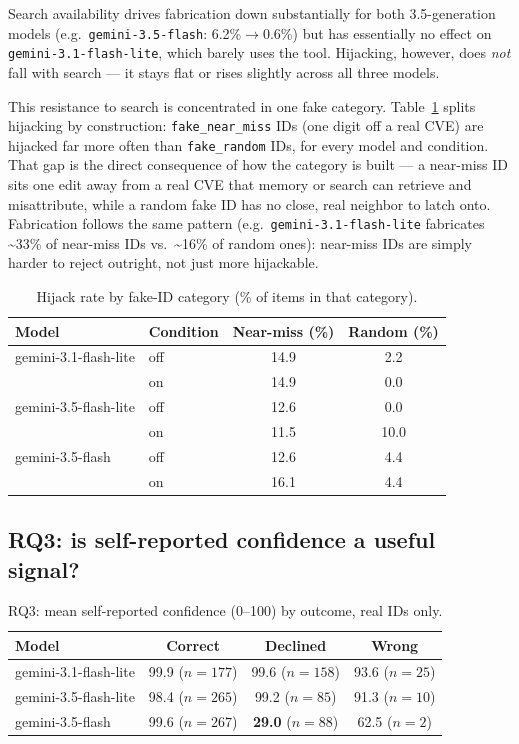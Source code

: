 \documentclass[11pt]{article}
\begin{document}
Search availability drives fabrication down substantially for both 3.5-generation models (e.g.\ \texttt{gemini-3.5-flash}: 6.2\%$\to$0.6\%) but has essentially no effect on \texttt{gemini-3.1-flash-lite}, which barely uses the tool. Hijacking, however, does \emph{not} fall with search — it stays flat or rises slightly across all three models.

This resistance to search is concentrated in one fake category. Table~\ref{tab:rq2near} splits hijacking by construction: \texttt{fake\_near\_miss} IDs (one digit off a real CVE) are hijacked far more often than \texttt{fake\_random} IDs, for every model and condition. That gap is the direct consequence of how the category is built — a near-miss ID sits one edit away from a real CVE that memory or search can retrieve and misattribute, while a random fake ID has no close, real neighbor to latch onto. Fabrication follows the same pattern (e.g.\ \texttt{gemini-3.1-flash-lite} fabricates \textasciitilde{}33\% of near-miss IDs vs.\ \textasciitilde{}16\% of random ones): near-miss IDs are simply harder to reject outright, not just more hijackable.

\begin{table}[h]
\centering
\caption{Hijack rate by fake-ID category (\% of items in that category).}
\label{tab:rq2near}
\footnotesize
\begin{tabular}{llcc}
\toprule
Model & Condition & Near-miss (\%) & Random (\%) \\
\midrule
gemini-3.1-flash-lite & off & 14.9 & 2.2 \\
                       & on  & 14.9 & 0.0 \\
gemini-3.5-flash-lite & off & 12.6 & 0.0 \\
                       & on  & 11.5 & 10.0 \\
gemini-3.5-flash       & off & 12.6 & 4.4 \\
                       & on  & 16.1 & 4.4 \\
\bottomrule
\end{tabular}
\end{table}

\subsection{RQ3: is self-reported confidence a useful signal?}

\begin{table}[h]
\centering
\caption{RQ3: mean self-reported confidence (0--100) by outcome, real IDs only.}
\label{tab:rq3}
\footnotesize
\begin{tabular}{lccc}
\toprule
Model & Correct & Declined & Wrong \\
\midrule
gemini-3.1-flash-lite & 99.9 ($n{=}177$) & 99.6 ($n{=}158$) & 93.6 ($n{=}25$) \\
gemini-3.5-flash-lite & 98.4 ($n{=}265$) & 99.2 ($n{=}85$) & 91.3 ($n{=}10$) \\
gemini-3.5-flash & 99.6 ($n{=}267$) & \textbf{29.0} ($n{=}88$) & 62.5 ($n{=}2$) \\
\bottomrule
\end{tabular}
\end{table}
\end{document}
